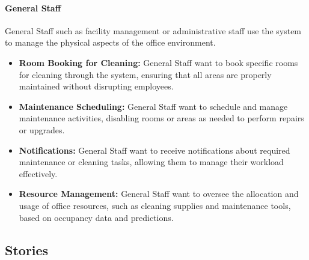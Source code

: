 \documentclass[11pt,a4paper]{article}
\begin{document}
\paragraph{General Staff}
General Staff such as facility management or administrative staff use the system to manage the physical aspects of the office environment.
\begin{itemize}
    \item \textbf{Room Booking for Cleaning:} General Staff want to book specific rooms for cleaning through the system, ensuring that all areas are properly maintained without disrupting employees.
    \item \textbf{Maintenance Scheduling:} General Staff want to schedule and manage maintenance activities, disabling rooms or areas as needed to perform repairs or upgrades.
    \item \textbf{Notifications:} General Staff want to receive notifications about required maintenance or cleaning tasks, allowing them to manage their workload effectively.
    \item \textbf{Resource Management:} General Staff want to oversee the allocation and usage of office resources, such as cleaning supplies and maintenance tools, based on occupancy data and predictions.
\end{itemize}

\pagebreak

\subsection*{Stories}
\end{document}
